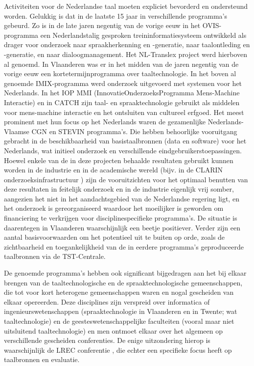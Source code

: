 \documentclass[]{../../metanetpaper}
\begin{document}
\begin{multicols}{2}
  Activiteiten voor de Nederlandse taal moeten expliciet bevorderd en ondersteund worden. Gelukkig is dat in de laatste 15 jaar in verschillende programma's gebeurd. Zo is in de late jaren negentig van de vorige eeuw in het OVIS-programma een Nederlandstalig gesproken treininformatiesysteem ontwikkeld als drager voor onderzoek naar spraakherkenning en -generatie, naar taalontleding en -generatie, en naar dialoogmanagement. Het NL-Translex project werd hierboven al genoemd. In Vlaanderen was er in het midden van de jaren negentig van de vorige eeuw een kortetermijnprogramma over taaltechnologie. In het boven al genoemde IMIX-programma werd onderzoek uitgevoerd met systemen voor het Nederlands. In het IOP MMI (InnovatieOnderzoeksProgramma Mens-Machine Interactie) en in CATCH \cite{CATCH}  zijn taal- en spraaktechnologie gebruikt als middelen voor mens-machine interactie en het ontsluiten van cultureel erfgoed. Het meest prominent met hun focus op het Nederlands waren de gezamenlijke Nederlands-Vlaamse CGN en STEVIN programma's. Die hebben behoorlijke vooruitgang gebracht in de beschikbaarheid van basistaalbronnen (data en software) voor het Nederlands, wat initieel onderzoek en verschillende eindgebruikerstoepassingen. Hoewel enkele van de in deze projecten behaalde resultaten gebruikt kunnen worden in de industrie en in de academische wereld (bijv. in de CLARIN onderzoeksinfrastructuur \cite{CLARIN-NL}) zijn de vooruitzichten voor het optimaal benutten van deze resultaten in feitelijk onderzoek en in de industrie eigenlijk vrij somber, aangezien het niet in het aandachtsgebied van de Nederlandse regering ligt, en het onderzoek is gereorganiseerd waardoor het moeilijker is geworden om financiering te verkrijgen voor disciplinespecifieke programma's. De situatie is daarentegen in Vlaanderen waarschijnlijk een beetje positiever. Verder zijn een aantal basisvoorwaarden om het potentieel uit te buiten op orde, zoals de zichtbaarheid en toegankelijkheid van de in eerdere programma's geproduceerde taalbronnen via de TST-Centrale.

  De genoemde programma's hebben ook significant bijgedragen aan het bij elkaar brengen van de taaltechnologische en de spraaktechnologische gemeenschappen, die tot voor kort heterogene gemeenschappen waren en nogal gescheiden van elkaar opereerden. Deze disciplines zijn verspreid over informatica of ingenieurswetenschappen (spraaktechnologie in Vlaanderen en in Twente; wat taaltechnologie) en de geesteswetenschappelijke faculteiten (vooral maar niet uitsluitend taaltechnologie) en men ontmoet elkaar over het algemeen op verschillende gescheiden conferenties. De enige uitzondering hierop is waarschijnlijk de LREC conferentie \cite{LREC}, die echter een specifieke focus heeft op taalbronnen en evaluatie.


\end{multicols}
\end{document}
